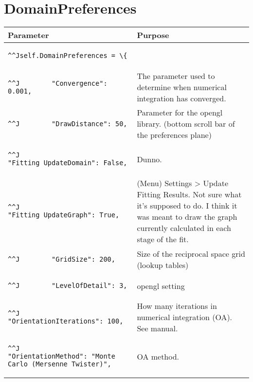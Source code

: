 \documentclass[12pt,a4paper,openany,oneside,oldfontcommands]{memoir}
\begin{document}
\section{DomainPreferences}	
\begin{tabularx}{\textwidth}{p{8cm} X}
	\toprule
	\textbf{Parameter}                              & \textbf{Purpose} \\
	\midrule
	\endhead
\begin{lstlisting}^^Jself.DomainPreferences = \{\end{lstlisting}    & \\
\begin{lstlisting}^^J        "Convergence": 0.001,\end{lstlisting}    & The parameter used to determine when numerical integration has converged. \\
\begin{lstlisting}^^J        "DrawDistance": 50,\end{lstlisting}    & Parameter for the opengl library. (bottom scroll bar of the preferences plane)\\
\begin{lstlisting}^^J        "Fitting_UpdateDomain": False,\end{lstlisting}    & Dunno. \\
\begin{lstlisting}^^J        "Fitting_UpdateGraph": True,\end{lstlisting}    & (Menu) Settings > Update Fitting Results. Not sure what it's supposed to do. I think it was meant to draw the graph currently calculated in each stage of the fit.  \\
\begin{lstlisting}^^J        "GridSize": 200,\end{lstlisting}    & Size of the reciprocal space grid (lookup tables) \\
\begin{lstlisting}^^J        "LevelOfDetail": 3,\end{lstlisting}    & opengl setting \\
\begin{lstlisting}^^J        "OrientationIterations": 100,\end{lstlisting}    & How many iterations in numerical integration (OA). See manual. \\
\begin{lstlisting}^^J        "OrientationMethod": "Monte Carlo (Mersenne Twister)",\end{lstlisting}    & OA method. \\

\end{tabularx}
\end{document}
